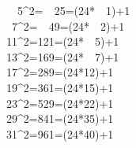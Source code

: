 ~~5^2=~~25=(24*~~1)+1\\
~7^2=~~49=(24*~~2)+1\\
11^2=121=(24*~~5)+1\\
13^2=169=(24*~~7)+1\\
17^2=289=(24*12)+1\\
19^2=361=(24*15)+1\\
23^2=529=(24*22)+1\\
29^2=841=(24*35)+1\\
31^2=961=(24*40)+1
